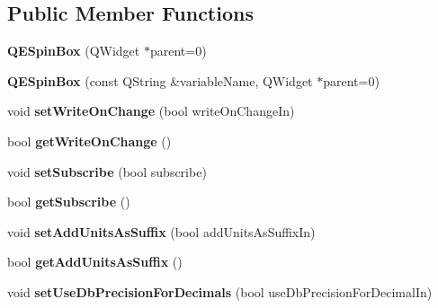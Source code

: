\subsection*{Public Member Functions}
\begin{DoxyCompactItemize}
\item 
\hypertarget{classQESpinBox_a883d60634a98d9131f6de71718bfb2d0}{
{\bfseries QESpinBox} (QWidget $\ast$parent=0)}
\label{classQESpinBox_a883d60634a98d9131f6de71718bfb2d0}

\item 
\hypertarget{classQESpinBox_ae2dff940d8664934b3ee5724ccbf2344}{
{\bfseries QESpinBox} (const QString \&variableName, QWidget $\ast$parent=0)}
\label{classQESpinBox_ae2dff940d8664934b3ee5724ccbf2344}

\item 
\hypertarget{classQESpinBox_a56962c44fc5d747d89638a3e0e8dad42}{
void {\bfseries setWriteOnChange} (bool writeOnChangeIn)}
\label{classQESpinBox_a56962c44fc5d747d89638a3e0e8dad42}

\item 
\hypertarget{classQESpinBox_ad77cb6a93477edd8f2b4b522715b12b4}{
bool {\bfseries getWriteOnChange} ()}
\label{classQESpinBox_ad77cb6a93477edd8f2b4b522715b12b4}

\item 
\hypertarget{classQESpinBox_a33ce67ef68b613b5bbc337531e8bfd53}{
void {\bfseries setSubscribe} (bool subscribe)}
\label{classQESpinBox_a33ce67ef68b613b5bbc337531e8bfd53}

\item 
\hypertarget{classQESpinBox_a6e45b81094e9d4f509fba10c9ac1cddd}{
bool {\bfseries getSubscribe} ()}
\label{classQESpinBox_a6e45b81094e9d4f509fba10c9ac1cddd}

\item 
\hypertarget{classQESpinBox_a4df41f217b6f28311d4a1ed93b04fa26}{
void {\bfseries setAddUnitsAsSuffix} (bool addUnitsAsSuffixIn)}
\label{classQESpinBox_a4df41f217b6f28311d4a1ed93b04fa26}

\item 
\hypertarget{classQESpinBox_a448fd2f2bae8db600044943e57eba51f}{
bool {\bfseries getAddUnitsAsSuffix} ()}
\label{classQESpinBox_a448fd2f2bae8db600044943e57eba51f}

\item 
\hypertarget{classQESpinBox_af5d546effcca643d97257d123e109d0b}{
void {\bfseries setUseDbPrecisionForDecimals} (bool useDbPrecisionForDecimalIn)}
\label{classQESpinBox_af5d546effcca643d97257d123e109d0b}


\end{DoxyCompactItemize}
